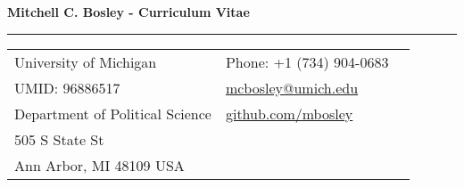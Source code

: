 \documentclass[letterpaper,11pt,oneside]{article}
\begin{document}

\noindent  \LARGE{\textbf{Mitchell C. Bosley - Curriculum Vitae}}  \\
\vspace{-2ex}
\hrule
\normalsize


\bigskip
\noindent
\begin{tabular}{@{} l l l}
  University of Michigan & \hspace{1in} Phone: +1 (734) 904-0683\\
  UMID: 96886517 & \hspace{1in} \href{mailto:mcbosley@umich.edu}{mcbosley@umich.edu} \\
  Department of Political Science & \hspace{1in} \url{github.com/mbosley}  \\
  505 S State St & \\
  Ann Arbor, MI 48109 USA & \\
\end{tabular}


\vspace{1em}
\end{document}
